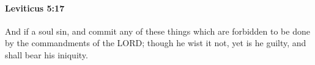 
		\paragraph{Leviticus 5:17} %
			\label{LEVITICUS-5-17}

			And if a soul sin, and commit any of these things which are forbidden to be done by the commandments of the LORD; though he wist it not, yet is he guilty, and shall bear his iniquity.


